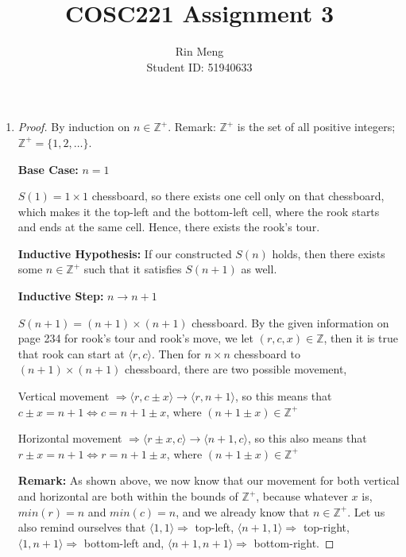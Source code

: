 \documentclass[12pt]{article}
\begin{document}
\title{COSC221 Assignment 3}
\author{Rin Meng \\ Student ID: 51940633}
\maketitle


\begin{enumerate}[label=Part \Alph*)]
    \item
    \begin{proof}[Proof]
        By induction on $n \in \mathbb{Z}^{+}$. Remark: $\mathbb{Z}^{+}$ is the set of all positive integers; $\mathbb{Z}^{+} = \{1, 2, \ldots \}$.
        
        \textbf{Base Case:} $n = 1$
        
        $S(1) = 1 \times 1$ chessboard, so there exists one cell only on that chessboard, which makes it the top-left and the bottom-left cell, where the rook starts and ends at the same cell. Hence, there exists the rook's tour.
        
        \textbf{Inductive Hypothesis:} If our constructed $S(n)$ holds, then there exists some $n \in \mathbb{Z}^{+}$ such that it satisfies $S(n + 1)$ as well.
        
        \textbf{Inductive Step:} $n \rightarrow n + 1$
        
        $S(n+1) = (n + 1) \times (n + 1)$ chessboard. By the given information on page 234 for rook's tour and rook's move, we let $(r, c, x) \in \mathbb{Z}$, then it is true that rook can start at $\langle r, c \rangle$. Then for $n \times n$ chessboard to $(n + 1) \times (n + 1)$ chessboard, there are two possible movement,
        
        Vertical movement $\Rightarrow \langle r, c \pm x \rangle \rightarrow \langle r, n+1 \rangle$, so this means that $c \pm x = n + 1 \Leftrightarrow c = n + 1 \pm x$, where $(n + 1 \pm x) \in \mathbb{Z}^{+}$
        
        Horizontal movement $\Rightarrow \langle r \pm x, c \rangle \rightarrow \langle n+1, c \rangle$, so this also means that $r \pm x = n + 1 \Leftrightarrow r = n + 1 \pm x$, where $(n + 1 \pm x) \in \mathbb{Z}^{+}$
        
        \textbf{Remark:} As shown above, we now know that our movement for both vertical and horizontal are both within the bounds of $\mathbb{Z}^{+}$, because whatever $x$ is, $min(r) = n$ and $min(c) = n$, and we already know that $n \in \mathbb{Z}^{+}$. Let us also remind ourselves that $\langle 1, 1 \rangle \Rightarrow $ top-left, $\langle n + 1, 1 \rangle \Rightarrow $ top-right, $\langle 1, n + 1 \rangle \Rightarrow $ bottom-left and, $\langle n + 1, n + 1 \rangle \Rightarrow $ bottom-right.
        

\end{proof}
\end{enumerate}
\end{document}
